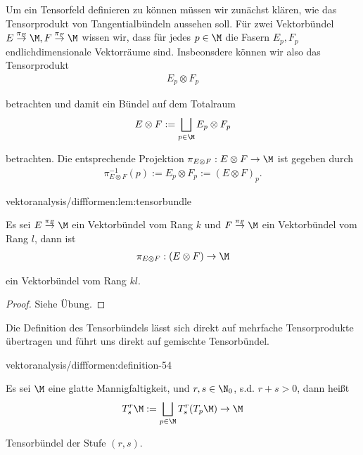 \documentclass[letterpaper,10pt,english]{jupyterBook}
\begin{document}
\par
Um ein Tensorfeld definieren zu können müssen wir zunächst klären, wie das Tensorprodukt von Tangentialbündeln aussehen soll. Für zwei Vektorbündel \(E\overset{\pi_E}{\to}{\M}, F\overset{\pi_F}{\to}{\M}\) wissen wir, dass für jedes \(p\in\M\) die Fasern \(E_p, F_p\) endlichdimensionale Vektorräume sind. Insbeonsdere können wir also das Tensorprodukt
\begin{align*}
E_p\otimes F_p
\end{align*}
\par
betrachten und damit ein Bündel auf dem Totalraum
\begin{align*}
E\otimes F:= \bigsqcup_{p\in\M} E_p\otimes F_p
\end{align*}
\par
betrachten. Die entsprechende Projektion \(\pi_{E\otimes F}:E\otimes F\to\M\) ist gegeben durch
\begin{align*}
\pi_{E\otimes F}^{-1}(p):= E_p\otimes F_p := (E\otimes F)_p.
\end{align*}\begin{lemma}{}{vektoranalysis/diffformen:lem:tensorbundle}



\par
Es sei \(E\overset{\pi_E}{\to}{\M}\) ein Vektorbündel vom Rang \(k\) und \(F\overset{\pi_F}{\to}{\M}\) ein Vektorbündel vom Rang \(l\), dann ist
\begin{align*}
\pi_{E\otimes F}:(E\otimes F)\to \M
\end{align*}
\par
ein Vektorbündel vom Rang \(kl\).
\end{lemma}

\begin{proof}
 Siehe Übung.
\end{proof}

\par
Die Definition des Tensorbündels lässt sich direkt auf mehrfache Tensorprodukte übertragen und führt uns direkt auf gemischte Tensorbündel.
\begin{definition}{}{vektoranalysis/diffformen:definition-54}



\par
Es sei \(\M\) eine glatte Mannigfaltigkeit, und \(r,s\in\N_0\), s.d. \(r+s>0\), dann heißt
\begin{align*}
T^r_s\M := \bigsqcup_{p\in\M} T^r_s(T_p\M) \to \M
\end{align*}
\par
Tensorbündel der Stufe \((r,s)\).
\end{definition}
\end{document}
